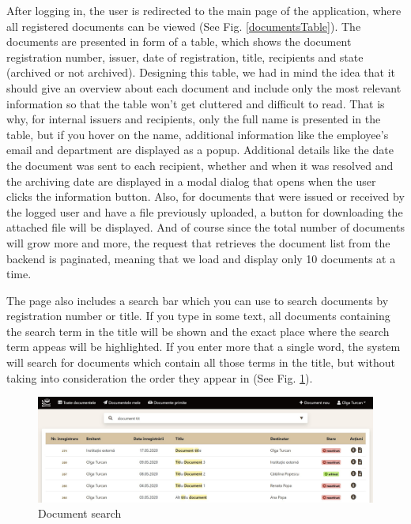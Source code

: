 After logging in, the user is redirected to the main page of the application, where all registered documents can be viewed (See Fig. \ref{documentsTable}). The documents are presented in form of a table, which shows the document registration number, issuer, date of registration, title, recipients and state (archived or not archived). Designing this table, we had in mind the idea that it should give an overview about each document and include only the most relevant information so that the table won't get cluttered and difficult to read. That is why, for internal issuers and recipients, only the full name is presented in the table, but if you hover on the name, additional information like the employee's email and department are displayed as a popup. Additional details like the date the document was sent to each recipient, whether and when it was resolved and the archiving date are displayed in a modal dialog that opens when the user clicks the information button. Also, for documents that were issued or received by the logged user and have a file previously uploaded, a button for downloading the attached file will be displayed. And of course since the total number of documents will grow more and more, the request that retrieves the document list from the backend is paginated, meaning that we load and display only 10 documents at a time.

The page also includes a search bar which you can use to search documents by registration number or title. If you type in some text, all documents containing the search term in the title will be shown and the exact place where the search term appeas will be highlighted. If you enter more that a single word, the system will search for documents which contain all those terms in the title, but without taking into consideration the order they appear in (See Fig. \ref{searchInline}).

\begin{figure}[H]
    \centering
    \includegraphics[width=5in]{images/app/search_inline_mix}
    \caption{Document search}
    \label{searchInline}
\end{figure}

